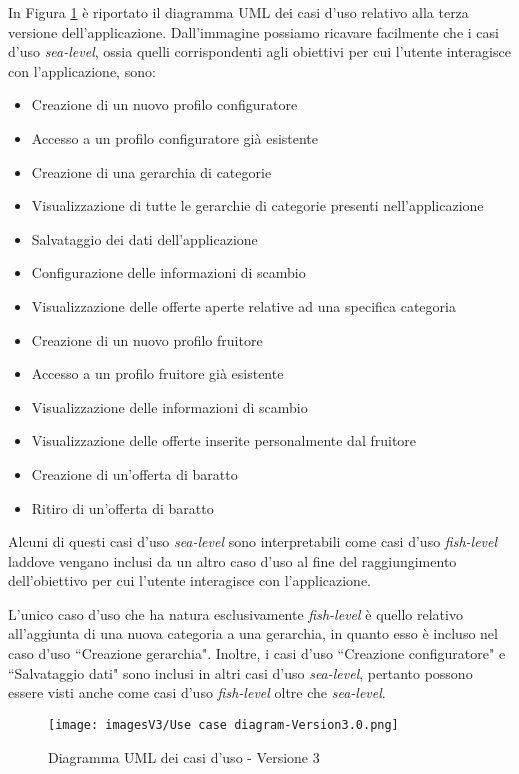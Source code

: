 In Figura \ref{fig:Use Case 3} è riportato il diagramma UML dei casi d'uso relativo alla terza versione dell'applicazione. Dall'immagine possiamo ricavare facilmente che i casi d'uso \textit{sea-level}, ossia quelli corrispondenti agli obiettivi per cui l'utente interagisce con l'applicazione, sono:
\begin{itemize}
    \item Creazione di un nuovo profilo configuratore 
    \item Accesso a un profilo configuratore già esistente
    \item Creazione di una gerarchia di categorie
    \item Visualizzazione di tutte le gerarchie di categorie presenti nell'applicazione
    \item Salvataggio dei dati dell'applicazione
    \item Configurazione delle informazioni di scambio
    \item Visualizzazione delle offerte aperte relative ad una specifica categoria
    \item Creazione di un nuovo profilo fruitore
    \item Accesso a un profilo fruitore già esistente
    \item Visualizzazione delle informazioni di scambio
    \item Visualizzazione delle offerte inserite personalmente dal fruitore
    \item Creazione di un'offerta di baratto
    \item Ritiro di un'offerta di baratto 
\end{itemize}
Alcuni di questi casi d'uso \textit{sea-level} sono interpretabili come casi d'uso \textit{fish-level} laddove vengano inclusi da un altro caso d'uso al fine del raggiungimento dell'obiettivo per cui l'utente interagisce con l'applicazione.

L'unico caso d'uso che ha natura esclusivamente \textit{fish-level} è quello relativo all'aggiunta di una nuova categoria a una gerarchia, in quanto esso è incluso nel caso d'uso ``Creazione gerarchia". Inoltre, i casi d'uso ``Creazione configuratore" e ``Salvataggio dati" sono inclusi in altri casi d'uso \textit{sea-level}, pertanto possono essere visti anche come casi d'uso \textit{fish-level} oltre che \textit{sea-level}.

\begin{figure}[ht]
\centering
\texttt{[image: imagesV3/Use case diagram-Version3.0.png]}
\caption{\label{fig:Use Case 3}Diagramma UML dei casi d'uso - Versione 3}
\end{figure}\bigskip

